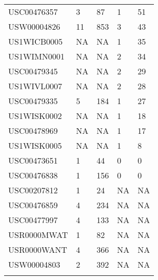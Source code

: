 \begin{center}
\begin{longtable}{l l l l l}
				  USC00476357 &   3 &  87 &   1 &  51 \\ 
				  USW00004826 &  11 & 853 &   3 &  43 \\ 
				  US1WICB0005 & NA & NA &   1 &  35 \\ 
				  US1WIMN0001 & NA & NA &   2 &  34 \\ 
				  USC00479345 & NA & NA &   2 &  29 \\ 
				  US1WIVL0007 & NA & NA &   2 &  28 \\ 
				  USC00479335 &   5 & 184 &   1 &  27 \\ 
				  US1WISK0002 & NA & NA &   1 &  18 \\ 
				  USC00478969 & NA & NA &   1 &  17 \\ 
				  US1WISK0005 & NA & NA &   1 &   8 \\ 
				  USC00473651 &   1 &  44 &   0 &   0 \\ 
				  USC00476838 &   1 & 156 &   0 &   0 \\ 
				  USC00207812 &   1 &  24 & NA & NA \\ 
				  USC00476859 &   4 & 234 & NA & NA \\ 
				  USC00477997 &   4 & 133 & NA & NA \\ 
				  USR0000MWAT &   1 &  82 & NA & NA \\ 
				  USR0000WANT &   4 & 366 & NA & NA \\ 
				  USW00004803 &   2 & 392 & NA & NA \\ 
   \label{tab:climate_stations}

		\end{longtable}
	\end{center}
